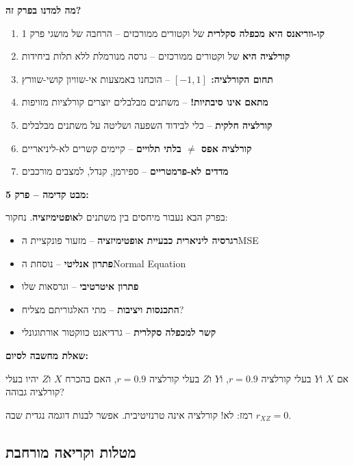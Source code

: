 
\textbf{מה למדנו בפרק זה?}

\begin{enumerate}
\item \textbf{קו-ווריאנס היא מכפלה סקלרית} של וקטורים ממורכזים – הרחבה של מושגי פרק \num{1}
\item \textbf{קורלציה היא } של וקטורים ממורכזים – גרסה מנורמלת ללא תלות ביחידות
\item \textbf{תחום הקורלציה: $[-1, 1]$} – הוכחנו באמצעות אי-שוויון קושי-שוורץ
\item \textbf{מתאם אינו סיבתיות!} – משתנים מבלבלים יוצרים קורלציות מזויפות
\item \textbf{קורלציה חלקית} – כלי לבידוד השפעה ושליטה על משתנים מבלבלים
\item \textbf{קורלציה אפס $\neq$ בלתי תלויים} – קיימים קשרים לא-ליניאריים
\item \textbf{מדדים לא-פרמטריים} – ספירמן, קנדל,  למצבים מורכבים
\end{enumerate}

\textbf{מבט קדימה – פרק \num{5}:}

בפרק הבא נעבור מיחסים בין משתנים ל\textbf{אופטימיזציה}. נחקור:

\begin{itemize}
\item \textbf{רגרסיה ליניארית כבעיית אופטימיזציה} – מזעור פונקציית ה\en{-}MSE
\item \textbf{פתרון אנליטי} – נוסחת ה\en{-}Normal Equation
\item \textbf{פתרון איטרטיבי} –  וגרסאות שלו
\item \textbf{התכנסות ויציבות} – מתי האלגוריתם מצליח?
\item \textbf{קשר למכפלה סקלרית} – גרדיאנט כווקטור אורתוגונלי
\end{itemize}

\textbf{שאלת מחשבה לסיום:}

אם $X$ ו\en{-}$Y$ בעלי קורלציה $r = 0.9$, ו\en{-}$Y$ ו\en{-}$Z$ בעלי קורלציה $r = 0.9$, האם בהכרח $X$ ו\en{-}$Z$ יהיו בעלי קורלציה גבוהה?

רמז: לא! קורלציה אינה טרנזיטיבית. אפשר לבנות דוגמה נגדית שבה $r_{XZ} = 0$.

\subsection*{מטלות וקריאה מורחבת}

